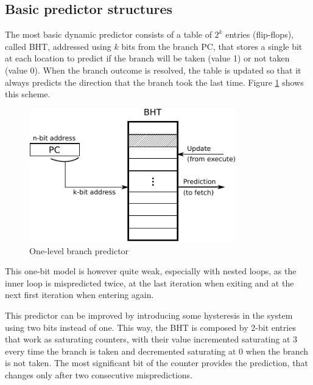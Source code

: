 \subsection{Basic predictor structures}
The most basic dynamic predictor consists of a table of $2^k$ entries (flip-flops), called \ac{BHT}, addressed using $k$ bits from the branch \ac{PC}, that stores a single bit at each location to predict if the branch will be taken (value 1) or not taken (value 0). When the branch outcome is resolved, the table is updated so that it always predicts the direction that the branch took the last time. Figure \ref{fig:one-level-bp} shows this scheme.
\begin{figure}[hbtp]
  \centering
  \includegraphics[width=0.8\textwidth]{img/one-level-bp.pdf}
  \caption[One-level branch predictor]{One-level branch predictor\footnotemark}
  \label{fig:one-level-bp}
\end{figure}

This one-bit model is however quite weak, especially with nested loops, as the inner loop is mispredicted twice, at the last iteration when exiting and at the next first iteration when entering again.

This predictor can be improved by introducing some hysteresis in the system using two bits instead of one. This way, the \ac{BHT} is composed by 2-bit entries that work as saturating counters, with their value incremented saturating at 3 every time the branch is taken and decremented saturating at 0 when the branch is not taken. The most significant bit of the counter provides the prediction, that changes only after two consecutive mispredictions.

